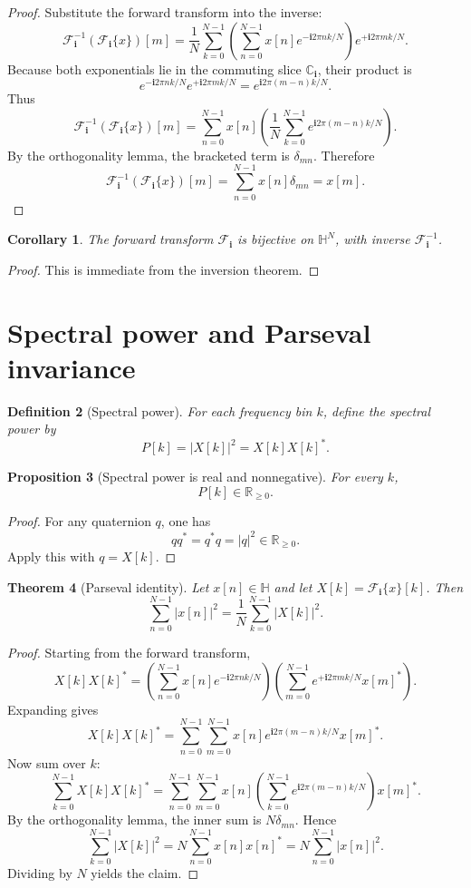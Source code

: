 \documentclass[11pt]{article}
\newtheorem{definition}{Definition}[section]
\newtheorem{proposition}[definition]{Proposition}
\newtheorem{theorem}[definition]{Theorem}
\newtheorem{corollary}[definition]{Corollary}
\theoremstyle{remark}
\newcommand{\R}{\mathbb{R}}
\newcommand{\C}{\mathbb{C}}
\newcommand{\HH}{\mathbb{H}}
\newcommand{\Ci}{\C_{\mathbf{i}}}
\newcommand{\ii}{\mathbf{i}}
\newcommand{\F}{\mathcal{F}_{\ii}}
\newcommand{\Finv}{\mathcal{F}_{\ii}^{-1}}
\newcommand{\abs}[1]{\left\lvert #1 \right\rvert}
\begin{document}
\begin{proof}
Substitute the forward transform into the inverse:
\[
\Finv(\F\{x\})[m]
=
\frac1N\sum_{k=0}^{N-1}
\left(
\sum_{n=0}^{N-1} x[n]e^{-\ii 2\pi nk/N}
\right)
e^{+\ii 2\pi mk/N}.
\]
Because both exponentials lie in the commuting slice \(\Ci\), their product is
\[
e^{-\ii 2\pi nk/N}e^{+\ii 2\pi mk/N}
=
e^{\ii 2\pi (m-n)k/N}.
\]
Thus
\[
\Finv(\F\{x\})[m]
=
\sum_{n=0}^{N-1}
x[n]
\left(
\frac1N\sum_{k=0}^{N-1} e^{\ii 2\pi (m-n)k/N}
\right).
\]
By the orthogonality lemma, the bracketed term is \(\delta_{mn}\). Therefore
\[
\Finv(\F\{x\})[m]
=
\sum_{n=0}^{N-1} x[n]\delta_{mn}
=
x[m].
\]
\end{proof}

\begin{corollary}
The forward transform \(\F\) is bijective on \(\HH^N\), with inverse \(\Finv\).
\end{corollary}

\begin{proof}
This is immediate from the inversion theorem.
\end{proof}

\section{Spectral power and Parseval invariance}

\begin{definition}[Spectral power]
For each frequency bin \(k\), define the spectral power by
\[
P[k]=\abs{X[k]}^2=X[k]X[k]^*.
\]
\end{definition}

\begin{proposition}[Spectral power is real and nonnegative]
For every \(k\),
\[
P[k]\in\R_{\ge 0}.
\]
\end{proposition}

\begin{proof}
For any quaternion \(q\), one has
\[
qq^*=q^*q=\abs{q}^2\in\R_{\ge 0}.
\]
Apply this with \(q=X[k]\).
\end{proof}

\begin{theorem}[Parseval identity]
Let \(x[n]\in\HH\) and let \(X[k]=\F\{x\}[k]\). Then
\[
\sum_{n=0}^{N-1}\abs{x[n]}^2
=
\frac1N\sum_{k=0}^{N-1}\abs{X[k]}^2.
\]
\end{theorem}

\begin{proof}
Starting from the forward transform,
\[
X[k]X[k]^*
=
\left(
\sum_{n=0}^{N-1}x[n]e^{-\ii 2\pi nk/N}
\right)
\left(
\sum_{m=0}^{N-1}e^{+\ii 2\pi mk/N}x[m]^*
\right).
\]
Expanding gives
\[
X[k]X[k]^*
=
\sum_{n=0}^{N-1}\sum_{m=0}^{N-1}
x[n]e^{\ii 2\pi (m-n)k/N}x[m]^*.
\]
Now sum over \(k\):
\[
\sum_{k=0}^{N-1}X[k]X[k]^*
=
\sum_{n=0}^{N-1}\sum_{m=0}^{N-1}
x[n]
\left(
\sum_{k=0}^{N-1}e^{\ii 2\pi (m-n)k/N}
\right)
x[m]^*.
\]
By the orthogonality lemma, the inner sum is \(N\delta_{mn}\). Hence
\[
\sum_{k=0}^{N-1}\abs{X[k]}^2
=
N\sum_{n=0}^{N-1}x[n]x[n]^*
=
N\sum_{n=0}^{N-1}\abs{x[n]}^2.
\]
Dividing by \(N\) yields the claim.
\end{proof}
\end{document}
